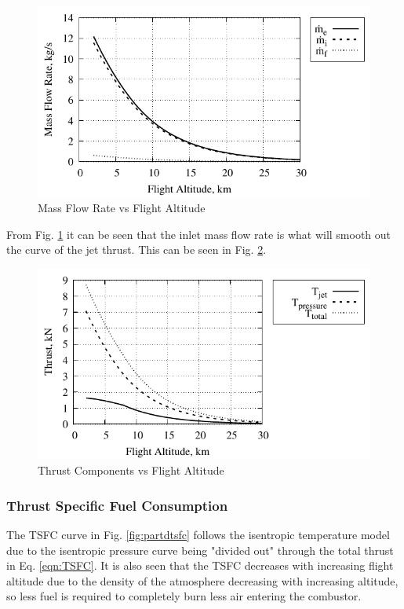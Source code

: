 \documentclass[conf]{new-aiaa} %
\begin{document}
\begin{figure}[H] %
    \centering
    \includegraphics[]{media/performance_parameter_files/part_d_mass_flow_rate.pdf}
    \caption{\label{fig:partdmassflowrate}Mass Flow Rate vs Flight Altitude}
\end{figure}
From Fig. \ref{fig:partdmassflowrate} it can be seen that the inlet mass flow rate is what will smooth out the curve of the jet thrust. This can be seen in Fig. \ref{fig:partdallthrust}.

\begin{figure}[H] %
    \centering
    \includegraphics[]{media/performance_parameter_files/part_d_all_thrust.pdf}
    \caption{\label{fig:partdallthrust}Thrust Components vs Flight Altitude}
\end{figure}

\subsubsection{Thrust Specific Fuel Consumption}
The TSFC curve in Fig. \ref{fig:partdtsfc} follows the isentropic temperature model due to the isentropic pressure curve being "divided out" through the total thrust in Eq. \ref{eqn:TSFC}. It is also seen that the TSFC decreases with increasing flight altitude due to the density of the atmosphere decreasing with increasing altitude, so less fuel is required to completely burn less air entering the combustor.
\end{document}
